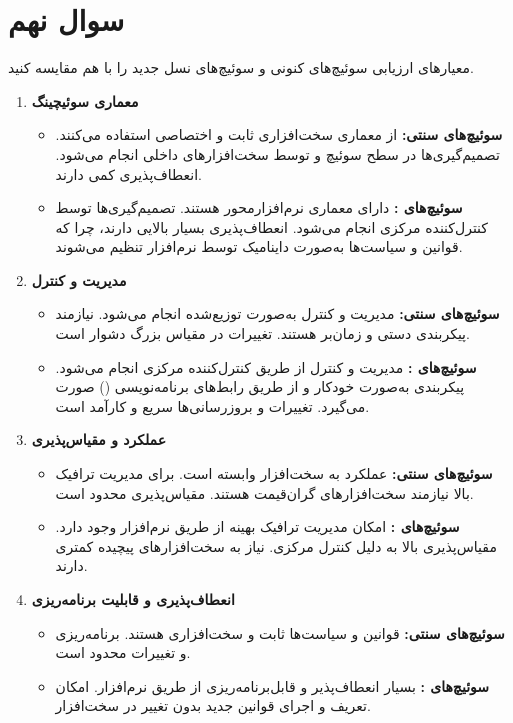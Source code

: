 \section{سوال نهم}

معیارهای ارزیابی سوئیچ‌های کنونی و سوئیچ‌های نسل جدید  را با هم مقایسه کنید.

\begin{qsolve}
	\begin{enumerate}
		\item \textbf{معماری سوئیچینگ}
		\begin{itemize}
			\item \textbf{سوئیچ‌های سنتی:} از معماری سخت‌افزاری ثابت و اختصاصی استفاده می‌کنند. تصمیم‌گیری‌ها در سطح سوئیچ و توسط سخت‌افزارهای داخلی انجام می‌شود. انعطاف‌پذیری کمی دارند.
			\item \textbf{سوئیچ‌های :} دارای معماری نرم‌افزارمحور هستند. تصمیم‌گیری‌ها توسط کنترل‌کننده مرکزی انجام می‌شود. انعطاف‌پذیری بسیار بالایی دارند، چرا که قوانین و سیاست‌ها به‌صورت داینامیک توسط نرم‌افزار تنظیم می‌شوند.
		\end{itemize}
		
		\item \textbf{مدیریت و کنترل}
		\begin{itemize}
			\item \textbf{سوئیچ‌های سنتی:} مدیریت و کنترل به‌صورت توزیع‌شده انجام می‌شود. نیازمند پیکربندی دستی و زمان‌بر هستند. تغییرات در مقیاس بزرگ دشوار است.
			\item \textbf{سوئیچ‌های :} مدیریت و کنترل از طریق کنترل‌کننده مرکزی انجام می‌شود. پیکربندی به‌صورت خودکار و از طریق رابط‌های برنامه‌نویسی () صورت می‌گیرد. تغییرات و بروزرسانی‌ها سریع و کارآمد است.
		\end{itemize}
		
		\item \textbf{عملکرد و مقیاس‌پذیری}
		\begin{itemize}
			\item \textbf{سوئیچ‌های سنتی:} عملکرد به سخت‌افزار وابسته است. برای مدیریت ترافیک بالا نیازمند سخت‌افزارهای گران‌قیمت هستند. مقیاس‌پذیری محدود است.
			\item \textbf{سوئیچ‌های :} امکان مدیریت ترافیک بهینه از طریق نرم‌افزار وجود دارد. مقیاس‌پذیری بالا به دلیل کنترل مرکزی. نیاز به سخت‌افزارهای پیچیده کمتری دارند.
		\end{itemize}
		
		\item \textbf{انعطاف‌پذیری و قابلیت برنامه‌ریزی}
		\begin{itemize}
			\item \textbf{سوئیچ‌های سنتی:} قوانین و سیاست‌ها ثابت و سخت‌افزاری هستند. برنامه‌ریزی و تغییرات محدود است.
			\item \textbf{سوئیچ‌های :} بسیار انعطاف‌پذیر و قابل‌برنامه‌ریزی از طریق نرم‌افزار. امکان تعریف و اجرای قوانین جدید بدون تغییر در سخت‌افزار.
		\end{itemize}
		

\end{enumerate}
\end{qsolve}
